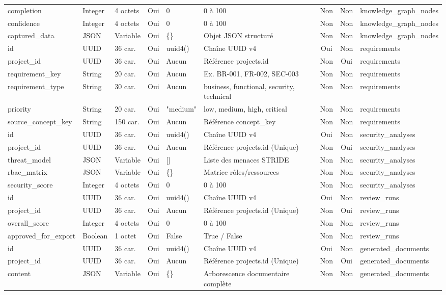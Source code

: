 \begin{table}[H]
{\begin{tabular}{|l|l|l|c|l|l|c|c|l|}
completion & Integer & 4 octets & Oui & 0 & 0 à 100 & Non & Non & knowledge\_graph\_nodes \\
confidence & Integer & 4 octets & Oui & 0 & 0 à 100 & Non & Non & knowledge\_graph\_nodes \\
captured\_data & JSON & Variable & Oui & \{\} & Objet JSON structuré & Non & Non & knowledge\_graph\_nodes \\
\hline
id & UUID & 36 car. & Oui & uuid4() & Chaîne UUID v4 & Oui & Non & requirements \\
project\_id & UUID & 36 car. & Oui & Aucun & Référence projects.id & Non & Oui & requirements \\
requirement\_key & String & 20 car. & Oui & Aucun & Ex. BR-001, FR-002, SEC-003 & Non & Non & requirements \\
requirement\_type & String & 30 car. & Oui & Aucun & business, functional, security, technical & Non & Non & requirements \\
priority & String & 20 car. & Oui & "medium" & low, medium, high, critical & Non & Non & requirements \\
source\_concept\_key & String & 150 car. & Oui & Aucun & Référence concept\_key & Non & Non & requirements \\
\hline
id & UUID & 36 car. & Oui & uuid4() & Chaîne UUID v4 & Oui & Non & security\_analyses \\
project\_id & UUID & 36 car. & Oui & Aucun & Référence projects.id (Unique) & Non & Oui & security\_analyses \\
threat\_model & JSON & Variable & Oui & [] & Liste des menaces STRIDE & Non & Non & security\_analyses \\
rbac\_matrix & JSON & Variable & Oui & \{\} & Matrice rôles/ressources & Non & Non & security\_analyses \\
security\_score & Integer & 4 octets & Oui & 0 & 0 à 100 & Non & Non & security\_analyses \\
\hline
id & UUID & 36 car. & Oui & uuid4() & Chaîne UUID v4 & Oui & Non & review\_runs \\
project\_id & UUID & 36 car. & Oui & Aucun & Référence projects.id (Unique) & Non & Oui & review\_runs \\
overall\_score & Integer & 4 octets & Oui & 0 & 0 à 100 & Non & Non & review\_runs \\
approved\_for\_export & Boolean & 1 octet & Oui & False & True / False & Non & Non & review\_runs \\
\hline
id & UUID & 36 car. & Oui & uuid4() & Chaîne UUID v4 & Oui & Non & generated\_documents \\
project\_id & UUID & 36 car. & Oui & Aucun & Référence projects.id (Unique) & Non & Oui & generated\_documents \\
content & JSON & Variable & Oui & \{\} & Arborescence documentaire complète & Non & Non & generated\_documents \\
\hline
\end{tabular}%
}
\end{table}

